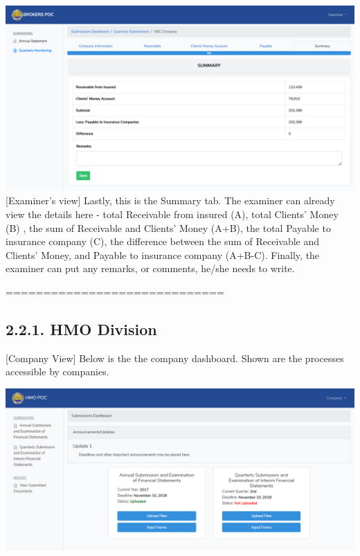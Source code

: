 \documentclass{article}
\begin{document}
\includegraphics[keepaspectratio=true]{up-ic-screens/image12}{}[Examiner’s view] Lastly, this is the Summary tab. The
examiner can already view the details here - total Receivable from
insured (A), total Clients’ Money (B) , the sum of Receivable and
Clients’ Money (A+B), the total Payable to insurance company (C), the
difference between the sum of Receivable and Clients’ Money, and Payable
to insurance company (A+B-C). Finally, the examiner can put any remarks,
or comments, he/she needs to write.%

\mdhr{}%

\noindent{}=============================%

\subsection{2.2.\hspace*{0.5em}1.  HMO Division}\label{sec-1-hmo-division}%

\noindent{}[Company View] Below is the the company dashboard.
Shown are the processes accessible by companies.%

\includegraphics[keepaspectratio=true]{up-ic-screens/image197}{}%
\end{document}
